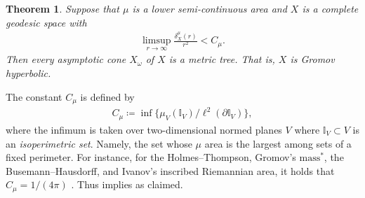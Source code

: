 \documentclass[a4paper,leqno]{amsart}
\numberwithin{equation}{section}
\newtheorem{theorem}{Theorem}[section]
\theoremstyle{remark}
\theoremstyle{remark}
\begin{document}
\begin{theorem}\label{theorem-gromov's-theorem}
Suppose that $\mu$ is a lower semi-continuous area and $X$ is a complete geodesic space with
\begin{align*}
    \limsup_{ r \rightarrow \infty } \frac{ \delta_{X}^{\mu}(r) }{ r^2 } < C_\mu.
\end{align*}
Then every asymptotic cone $X_\omega$ of $X$ is a metric tree. That is, $X$ is Gromov hyperbolic.
\end{theorem}
The constant $C_\mu$ is defined by
\begin{align}\label{equation-the-isoperimetric-constant}
    C_{\mu} \coloneqq \inf\{ \mu_V( \mathbb{I}_V ) / \ell^{2}( \partial \mathbb{I}_V ) \},
\end{align}
where the infimum is taken over two-dimensional normed planes $V$ where $\mathbb{I}_V \subset V$ is an \emph{isoperimetric set}. Namely, the set whose $\mu$ area is the largest among sets of a fixed perimeter. For instance, for the Holmes--Thompson, Gromov's $\text{mass}^{*}$, the Busemann--Hausdorff, and Ivanov's inscribed Riemannian area, it holds that $C_\mu = 1/(4\pi)$ \cite{alvarez-thompson-2004-volumes-on-normed-and-finsler-spaces}. Thus  implies  as claimed.
\end{document}
